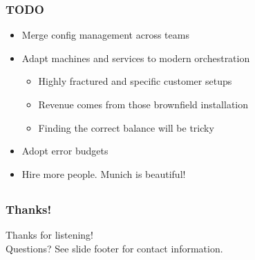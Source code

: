 \documentclass[t]{beamer}
\begin{document}
\begin{frame}
	\frametitle{TODO}
	\begin{itemize}
		\item Merge config management across teams
		\item Adapt machines and services to modern orchestration
		\begin{itemize}
			\item Highly fractured and specific customer setups
			\item Revenue comes from those brownfield installation
			\item Finding the correct balance will be tricky
		\end{itemize}
		\item Adopt error budgets
		\item Hire more people. Munich is beautiful!
	\end{itemize}
\end{frame}









%





\subsection{}

\begin{frame}
	\frametitle{Thanks!}
		\begin{center}
			\vfill
			Thanks for listening!\\
			\vfill
			Questions?
			\vfill
			See slide footer for contact information.
			\vfill
		\end{center}
\end{frame}
\end{document}
